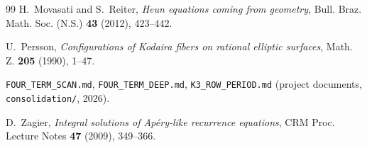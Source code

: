 \documentclass[11pt,reqno]{amsart}
\theoremstyle{plain}
\theoremstyle{definition}
\theoremstyle{remark}
\theoremstyle{plain}
\begin{document}
\begin{thebibliography}{99}
H.~Movasati and S.~Reiter,
\emph{Heun equations coming from geometry},
Bull. Braz. Math. Soc. (N.S.) \textbf{43} (2012), 423--442.

U.~Persson,
\emph{Configurations of Kodaira fibers on rational elliptic surfaces},
Math. Z. \textbf{205} (1990), 1--47.

\texttt{FOUR\_TERM\_SCAN.md}, \texttt{FOUR\_TERM\_DEEP.md},
\texttt{K3\_ROW\_PERIOD.md} (project documents, \texttt{consolidation/}, 2026).

D.~Zagier, \emph{Integral solutions of Ap\'ery-like recurrence equations},
CRM Proc. Lecture Notes \textbf{47} (2009), 349--366.

\end{thebibliography}
\end{document}
